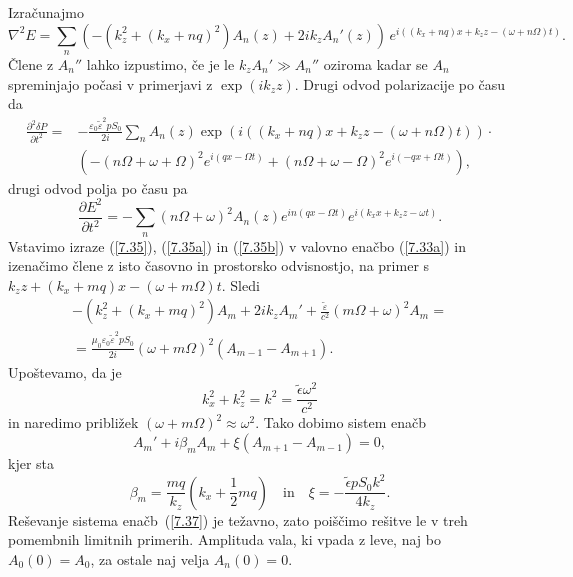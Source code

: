 Izračunajmo 
\begin{equation}
\nabla^{2}E=\sum_{n}\left( -(k_{z}^{2}+(k_{x}+nq)^{2})A_{n}(z)+2ik_{z}A_{n}'(z)\right) \, 
e^{i((k_x+nq)x+k_{z}z-(\omega+n\Omega)t)}.
\label{7.35}
\end{equation}
Člene z $A_{n}''$ lahko izpustimo, če je le $k_{z}A_{n}'\gg A_{n}''$ oziroma 
kadar se $A_{n}$ spreminjajo počasi v primerjavi z $\exp(ik_{z}z)$. Drugi odvod 
polarizacije po času da
\begin{equation}
\begin{split}
\frac{\partial^2 \delta P}{\partial t^2} =&-\frac{\varepsilon_0 \tilde{\varepsilon}^2pS_0}{2i} 
\sum_{n} A_n(z) \exp\left(i((k_x+nq)x+k_{z}z-(\omega+n\Omega)t)\right) \cdot \\ &\left(
-(n\Omega+\omega+\Omega)^2e^{i(qx-\Omega t)} + (n\Omega+\omega-\Omega)^2e^{i(-qx+\Omega t)} \right),
\label{7.35a}
\end{split}
\end{equation}
drugi odvod polja po času pa 
\begin{equation}
\frac{\partial E^{2}}{\partial t^{2}} = - \sum_{n}(n\Omega + \omega)^2 
A_{n}(z)e^{in(qx-\Omega t)}e^{i(k_{x}x+k_{z}z-\omega t)}.
\label{7.35b}
\end{equation}
Vstavimo izraze (\ref{7.35}), (\ref{7.35a}) in (\ref{7.35b}) v valovno enačbo (\ref{7.33a})
in izenačimo člene z isto časovno in prostorsko odvisnostjo, na primer
s $k_z z+(k_x+mq)x-(\omega+m\Omega)t$. Sledi
\begin{eqnarray}
-\left(k_{z}^{2}+(k_{x}+mq)^{2}\right)A_{m}+2ik_{z}A_{m}' + \frac{\tilde{\varepsilon}}{c^2}(m\Omega+\omega)^2A_m
=\\ =\frac{\mu_0\varepsilon_0\tilde{\varepsilon}^2pS_0}{2i}(\omega+m\Omega)^{2}(A_{m-1}-A_{m+1}).
\end{eqnarray}
Upoštevamo, da je 
\begin{equation} 
k_{x}^{2}+k_{z}^{2}=k^{2}=\frac{\tilde{\epsilon}\omega^2}{c^{2}}
\end{equation}
in naredimo približek $(\omega +m\Omega)^2 \approx \omega^2$.
Tako dobimo sistem enačb
\begin{equation}
A_{m}'+i\beta_{m}A_{m}+\xi(A_{m+1}-A_{m-1})=0,
\label{7.37}
\end{equation}
kjer sta
\begin{equation}
\beta_{m}=\frac{mq}{k_{z}}(k_{x}+\frac{1}{2}mq) \quad \mathrm{in} \quad \xi=-\frac{\tilde{\epsilon} pS_0k^2}{4k_z}.
\label{7.38}
\end{equation}
Reševanje sistema enačb~(\ref{7.37}) je težavno, zato poiščimo rešitve le v treh
pomembnih limitnih primerih. Amplituda vala, ki vpada z leve, naj bo $A_{0}(0)=A_{0}$, 
za ostale naj velja $A_{n}(0)=0$.

